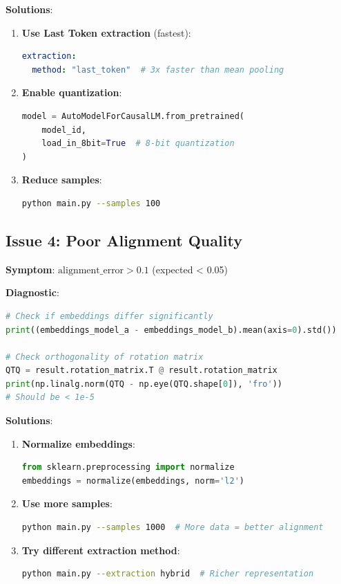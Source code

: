 \documentclass[12pt,a4paper,oneside]{report}
\begin{document}
\textbf{Solutions}:

\begin{enumerate}
    \item \textbf{Use Last Token extraction} (fastest):
    \begin{lstlisting}[language=YAML]
extraction:
  method: "last_token"  # 3x faster than mean pooling
    \end{lstlisting}

    \item \textbf{Enable quantization}:
    \begin{lstlisting}[language=Python]
model = AutoModelForCausalLM.from_pretrained(
    model_id,
    load_in_8bit=True  # 8-bit quantization
)
    \end{lstlisting}

    \item \textbf{Reduce samples}:
    \begin{lstlisting}[language=Bash]
python main.py --samples 100
    \end{lstlisting}
\end{enumerate}

\subsection{Issue 4: Poor Alignment Quality}

\textbf{Symptom}: $\text{alignment\_error} > 0.1$ (expected < 0.05)

\textbf{Diagnostic}:

\begin{lstlisting}[language=Python]
# Check if embeddings differ significantly
print((embeddings_model_a - embeddings_model_b).mean(axis=0).std())

# Check orthogonality of rotation matrix
QTQ = result.rotation_matrix.T @ result.rotation_matrix
print(np.linalg.norm(QTQ - np.eye(QTQ.shape[0]), 'fro'))
# Should be < 1e-5
\end{lstlisting}

\textbf{Solutions}:

\begin{enumerate}
    \item \textbf{Normalize embeddings}:
    \begin{lstlisting}[language=Python]
from sklearn.preprocessing import normalize
embeddings = normalize(embeddings, norm='l2')
    \end{lstlisting}

    \item \textbf{Use more samples}:
    \begin{lstlisting}[language=Bash]
python main.py --samples 1000  # More data = better alignment
    \end{lstlisting}

    \item \textbf{Try different extraction method}:
    \begin{lstlisting}[language=Bash]
python main.py --extraction hybrid  # Richer representation
    \end{lstlisting}
\end{enumerate}
\end{document}
